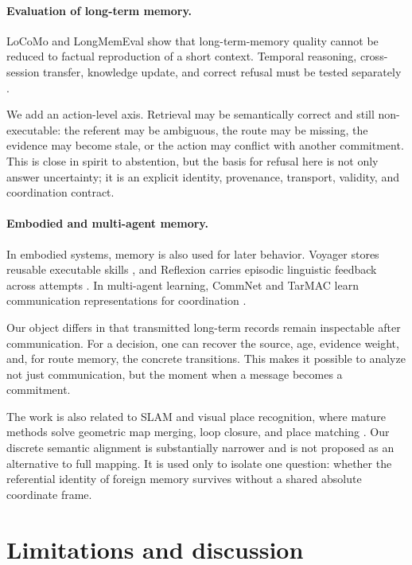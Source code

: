 \documentclass{article}
\begin{document}
\paragraph{Evaluation of long-term memory.}
LoCoMo and LongMemEval show that long-term-memory quality cannot be reduced to factual reproduction of a short context. Temporal reasoning, cross-session transfer, knowledge update, and correct refusal must be tested separately \citep{maharana2024locomo,wu2024longmemeval}.

We add an action-level axis. Retrieval may be semantically correct and still non-executable: the referent may be ambiguous, the route may be missing, the evidence may become stale, or the action may conflict with another commitment. This is close in spirit to abstention, but the basis for refusal here is not only answer uncertainty; it is an explicit identity, provenance, transport, validity, and coordination contract.

\paragraph{Embodied and multi-agent memory.}
In embodied systems, memory is also used for later behavior. Voyager stores reusable executable skills \citep{wang2023voyager}, and Reflexion carries episodic linguistic feedback across attempts \citep{shinn2023reflexion}. In multi-agent learning, CommNet and TarMAC learn communication representations for coordination \citep{sukhbaatar2016commnet,das2019tarmac}.

Our object differs in that transmitted long-term records remain inspectable after communication. For a decision, one can recover the source, age, evidence weight, and, for route memory, the concrete transitions. This makes it possible to analyze not just communication, but the moment when a message becomes a commitment.

The work is also related to SLAM and visual place recognition, where mature methods solve geometric map merging, loop closure, and place matching \citep{cadena2016slam,lowry2016vpr}. Our discrete semantic alignment is substantially narrower and is not proposed as an alternative to full mapping. It is used only to isolate one question: whether the referential identity of foreign memory survives without a shared absolute coordinate frame.

\section{Limitations and discussion}
\end{document}
